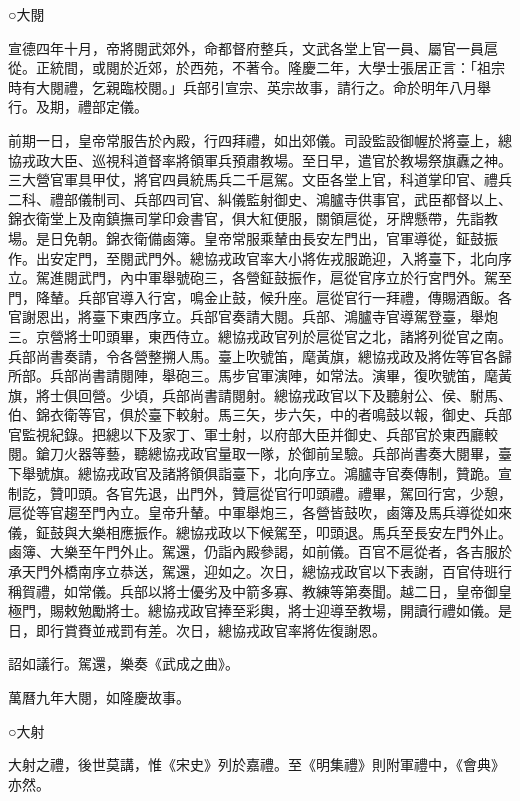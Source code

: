 ○大閱

宣德四年十月，帝將閱武郊外，命都督府整兵，文武各堂上官一員、屬官一員扈從。正統間，或閱於近郊，於西苑，不著令。隆慶二年，大學士張居正言：「祖宗時有大閱禮，乞親臨校閱。」兵部引宣宗、英宗故事，請行之。命於明年八月舉行。及期，禮部定儀。

前期一日，皇帝常服告於內殿，行四拜禮，如出郊儀。司設監設御幄於將臺上，總協戎政大臣、巡視科道督率將領軍兵預肅教場。至日早，遣官於教場祭旗纛之神。三大營官軍具甲仗，將官四員統馬兵二千扈駕。文臣各堂上官，科道掌印官、禮兵二科、禮部儀制司、兵部四司官、糾儀監射御史、鴻臚寺供事官，武臣都督以上、錦衣衛堂上及南鎮撫司掌印僉書官，俱大紅便服，關領扈從，牙牌懸帶，先詣教場。是日免朝。錦衣衛備鹵簿。皇帝常服乘輦由長安左門出，官軍導從，鉦鼓振作。出安定門，至閱武門外。總協戎政官率大小將佐戎服跪迎，入將臺下，北向序立。駕進閱武門，內中軍舉號砲三，各營鉦鼓振作，扈從官序立於行宮門外。駕至門，降輦。兵部官導入行宮，鳴金止鼓，候升座。扈從官行一拜禮，傳賜酒飯。各官謝恩出，將臺下東西序立。兵部官奏請大閱。兵部、鴻臚寺官導駕登臺，舉炮三。京營將士叩頭畢，東西侍立。總協戎政官列於扈從官之北，諸將列從官之南。兵部尚書奏請，令各營整搠人馬。臺上吹號笛，麾黃旗，總協戎政及將佐等官各歸所部。兵部尚書請閱陣，舉砲三。馬步官軍演陣，如常法。演畢，復吹號笛，麾黃旗，將士俱回營。少頃，兵部尚書請閱射。總協戎政官以下及聽射公、侯、駙馬、伯、錦衣衛等官，俱於臺下較射。馬三矢，步六矢，中的者鳴鼓以報，御史、兵部官監視紀錄。把總以下及家丁、軍士射，以府部大臣并御史、兵部官於東西廳較閱。鎗刀火器等藝，聽總協戎政官量取一隊，於御前呈驗。兵部尚書奏大閱畢，臺下舉號旗。總協戎政官及諸將領俱詣臺下，北向序立。鴻臚寺官奏傳制，贊跪。宣制訖，贊叩頭。各官先退，出門外，贊扈從官行叩頭禮。禮畢，駕回行宮，少憩，扈從等官趨至門內立。皇帝升輦。中軍舉炮三，各營皆鼓吹，鹵簿及馬兵導從如來儀，鉦鼓與大樂相應振作。總協戎政以下候駕至，叩頭退。馬兵至長安左門外止。鹵簿、大樂至午門外止。駕還，仍詣內殿參謁，如前儀。百官不扈從者，各吉服於承天門外橋南序立恭送，駕還，迎如之。次日，總協戎政官以下表謝，百官侍班行稱賀禮，如常儀。兵部以將士優劣及中箭多寡、教練等第奏聞。越二日，皇帝御皇極門，賜敕勉勵將士。總協戎政官捧至彩輿，將士迎導至教場，開讀行禮如儀。是日，即行賞賚並戒罰有差。次日，總協戎政官率將佐復謝恩。

詔如議行。駕還，樂奏《武成之曲》。

萬曆九年大閱，如隆慶故事。

○大射

大射之禮，後世莫講，惟《宋史》列於嘉禮。至《明集禮》則附軍禮中，《會典》亦然。

